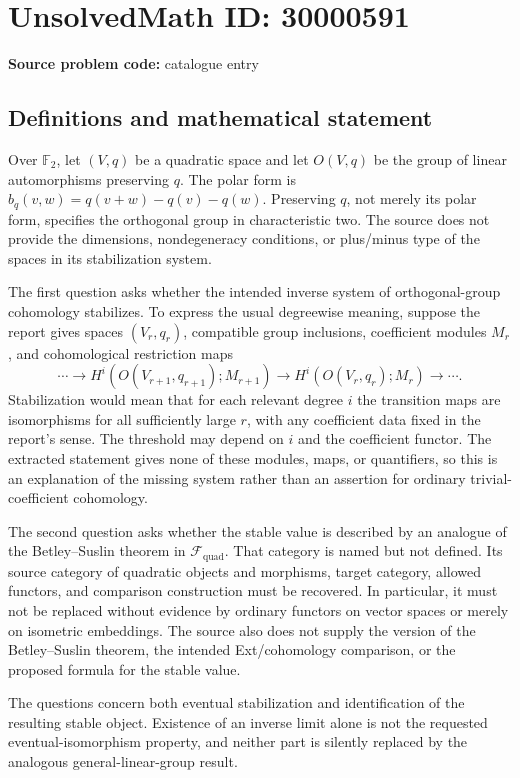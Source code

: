 \documentclass[11pt]{article}
\newcommand{\F}{\mathbb{F}}
\begin{document}
\section*{UnsolvedMath ID: 30000591}
\textbf{Source problem code:} catalogue entry
\subsection{Definitions and mathematical statement}
Over $\F_2$, let $(V,q)$ be a quadratic space and let $O(V,q)$ be the group of linear automorphisms preserving $q$. The polar form is $b_q(v,w)=q(v+w)-q(v)-q(w)$. Preserving $q$, not merely its polar form, specifies the orthogonal group in characteristic two. The source does not provide the dimensions, nondegeneracy conditions, or plus/minus type of the spaces in its stabilization system.

The first question asks whether the intended inverse system of orthogonal-group cohomology stabilizes. To express the usual degreewise meaning, suppose the report gives spaces $(V_r,q_r)$, compatible group inclusions, coefficient modules $M_r$, and cohomological restriction maps
\[
 \cdots\longrightarrow H^i(O(V_{r+1},q_{r+1});M_{r+1})
       \longrightarrow H^i(O(V_r,q_r);M_r)\longrightarrow\cdots.
\]
Stabilization would mean that for each relevant degree $i$ the transition maps are isomorphisms for all sufficiently large $r$, with any coefficient data fixed in the report's sense. The threshold may depend on $i$ and the coefficient functor. The extracted statement gives none of these modules, maps, or quantifiers, so this is an explanation of the missing system rather than an assertion for ordinary trivial-coefficient cohomology.

The second question asks whether the stable value is described by an analogue of the Betley--Suslin theorem in $\mathcal F_{\mathrm{quad}}$. That category is named but not defined. Its source category of quadratic objects and morphisms, target category, allowed functors, and comparison construction must be recovered. In particular, it must not be replaced without evidence by ordinary functors on vector spaces or merely on isometric embeddings. The source also does not supply the version of the Betley--Suslin theorem, the intended Ext/cohomology comparison, or the proposed formula for the stable value.

The questions concern both eventual stabilization and identification of the resulting stable object. Existence of an inverse limit alone is not the requested eventual-isomorphism property, and neither part is silently replaced by the analogous general-linear-group result.
\end{document}
